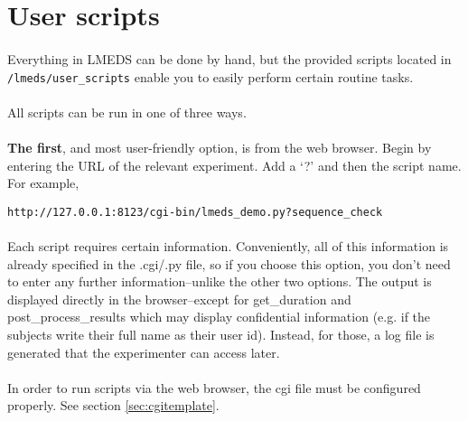 
\section{User scripts}
\label{users_scripts}

\paragraph{}
Everything in LMEDS can be done by hand, but the provided scripts located in \\\texttt{/lmeds/user\_scripts} enable you to easily perform certain routine tasks.

\paragraph{}
All scripts can be run in one of three ways.  

\paragraph{}
\textbf{The first}, and most user-friendly option, is from the web browser.  Begin by entering the URL of the relevant experiment.  Add a `?' and then the script name.  For example,
\begin{lstlisting}
http://127.0.0.1:8123/cgi-bin/lmeds_demo.py?sequence_check
\end{lstlisting}

\paragraph{}
Each script requires certain information.  Conveniently, all of this information is already specified in the .cgi/.py file, so if you choose this option, you don't need to enter any further information--unlike the other two options.  The output is displayed directly in the browser--except for get\_duration and post\_process\_results which may display confidential information (e.g. if the subjects write their full name as their user id).  Instead, for those, a log file is generated that the experimenter can access later.

\paragraph{}
In order to run scripts via the web browser, the cgi file must be configured properly.  See section \ref{sec:cgitemplate}.

